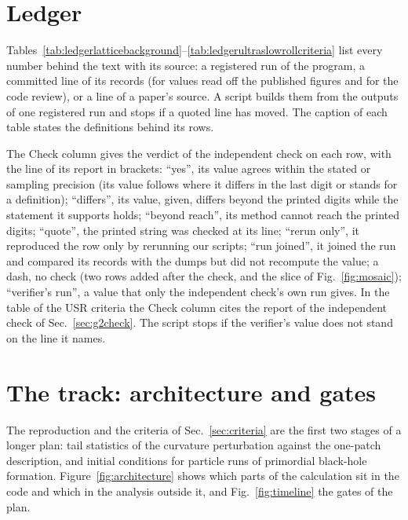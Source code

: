 \documentclass[aps,prd,twocolumn,10pt,superscriptaddress,nofootinbib,longbibliography,floatfix]{revtex4-2}
\begin{document}
\section{Ledger}\label{app:ledger}

Tables~\ref{tab:ledgerlatticebackground}--\ref{tab:ledgerultraslowrollcriteria} list every number behind the text with its source: a registered run of the program, a committed line of its records (for values read off the published figures and for the code review), or a line of a paper's source. A script builds them from the outputs of one registered run and stops if a quoted line has moved. The caption of each table states the definitions behind its rows.

The Check column gives the verdict of the independent check on each row, with the line of its report in brackets: ``yes'', its value agrees within the stated or sampling precision (its value follows where it differs in the last digit or stands for a definition); ``differs'', its value, given, differs beyond the printed digits while the statement it supports holds; ``beyond reach'', its method cannot reach the printed digits; ``quote'', the printed string was checked at its line; ``rerun only'', it reproduced the row only by rerunning our scripts; ``run joined'', it joined the run and compared its records with the dumps but did not recompute the value; a dash, no check (two rows added after the check, and the slice of Fig.~\ref{fig:mosaic}); ``verifier's run'', a value that only the independent check's own run gives. In the table of the USR criteria the Check column cites the report of the independent check of Sec.~\ref{sec:g2check}. The script stops if the verifier's value does not stand on the line it names.




\clearpage
\section{The track: architecture and gates}\label{app:track}

The reproduction and the criteria of Sec.~\ref{sec:criteria} are the first two stages of a longer plan: tail statistics of the curvature perturbation against the one-patch description, and initial conditions for particle runs of primordial black-hole formation. Figure~\ref{fig:architecture} shows which parts of the calculation sit in the code and which in the analysis outside it, and Fig.~\ref{fig:timeline} the gates of the plan.
\end{document}
